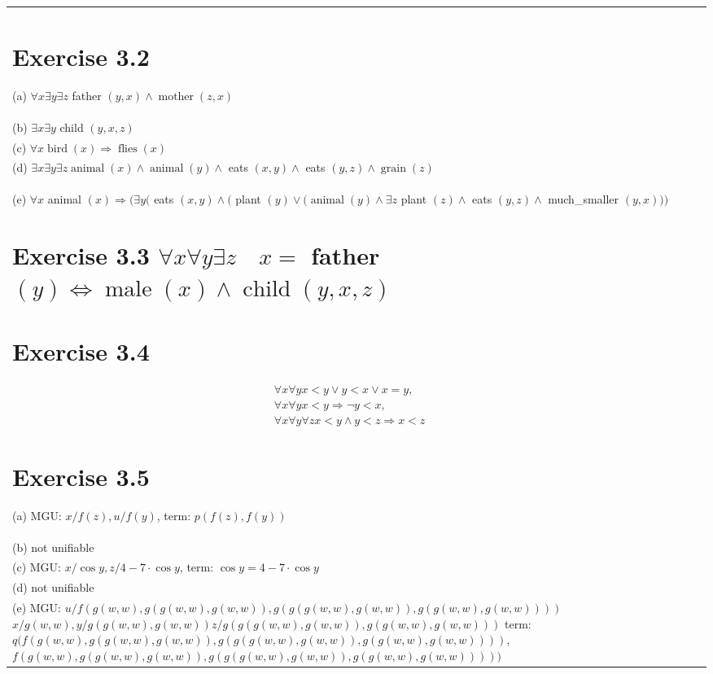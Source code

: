 \documentclass[10pt]{book}
\begin{document}
\begin{center}
\begin{tabular}{|l|l|l|}
\section{Exercise 3.2}
(a) $\forall x \exists y \exists z$ father $(y, x) \wedge \operatorname{mother}(z, x)$\\
(b) $\exists x \exists y$ child $(y, x, z)$\\
(c) $\forall x \operatorname{bird}(x) \Rightarrow \operatorname{flies}(x)$\\
(d) $\exists x \exists y \exists z \operatorname{animal}(x) \wedge \operatorname{animal}(y) \wedge$ eats $(x, y) \wedge$ eats $(y, z) \wedge \operatorname{grain}(z)$\\
(e) $\forall x$ animal $(x) \Rightarrow(\exists y($ eats $(x, y) \wedge($ plant $(y) \vee(\operatorname{animal}(y) \wedge \exists z$ plant $(z) \wedge$ eats $(y, z) \wedge$ much\_smaller $(y, x)))$

\section{Exercise 3.3 $\forall x \forall y \exists z \quad x=$ father $(y) \Leftrightarrow \operatorname{male}(x) \wedge \operatorname{child}(y, x, z)$}
\section{Exercise 3.4}
$$
\begin{aligned}
& \forall x \forall y x<y \vee y<x \vee x=y, \\
& \forall x \forall y x<y \Rightarrow \neg y<x, \\
& \forall x \forall y \forall z x<y \wedge y<z \Rightarrow x<z
\end{aligned}
$$

\section{Exercise 3.5}
(a) MGU: $x / f(z), u / f(y)$, term: $p(f(z), f(y))$\\
(b) not unifiable\\
(c) MGU: $x / \cos y, z / 4-7 \cdot \cos y$, term: $\cos y=4-7 \cdot \cos y$\\
(d) not unifiable\\
(e) MGU: $u / f(g(w, w), g(g(w, w), g(w, w)), g(g(g(w, w), g(w, w)), g(g(w, w), g(w, w))))$ $x / g(w, w), y / g(g(w, w), g(w, w)) z / g(g(g(w, w), g(w, w)), g(g(w, w), g(w, w)))$ term: $q(f(g(w, w), g(g(w, w), g(w, w)), g(g(g(w, w), g(w, w)), g(g(w, w), g(w, w))))$, $f(g(w, w), g(g(w, w), g(w, w)), g(g(g(w, w), g(w, w)), g(g(w, w), g(w, w)))))$


\end{tabular}
\end{center}
\end{document}
